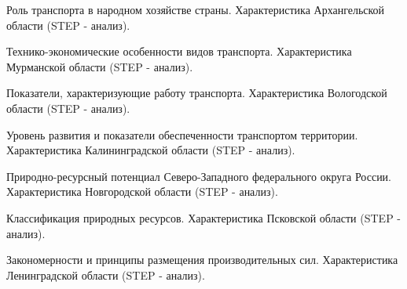 \documentclass[
	14pt,
	a4paper,
	]
	{scrartcl}
\begin{document}
\vfill

\newpage


\shapk
{}
\setcounter{zad}{0}

\vfill
\z Роль транспорта в народном хозяйстве страны.
 \vfill
\z Характеристика Архангельской области (STEP - анализ).
 \vfill

\vfill

\newpage


\shapk
{}
\setcounter{zad}{0}

\vfill
\z Технико-экономические особенности видов транспорта.
 \vfill
\z Характеристика Мурманской области (STEP - анализ).
 \vfill

\vfill

\newpage


\shapk
{}
\setcounter{zad}{0}

\vfill
\z Показатели, характеризующие работу транспорта.
 \vfill
\z Характеристика Вологодской области (STEP - анализ).
 \vfill

\vfill

\newpage


\shapk
{}
\setcounter{zad}{0}

\vfill
\z Уровень развития и показатели обеспеченности транспортом территории.
 \vfill
\z Характеристика Калининградской области (STEP - анализ).
 \vfill

\vfill

\newpage


\shapk
{}
\setcounter{zad}{0}

\vfill
\z Природно-ресурсный потенциал Северо-Западного федерального округа России.
 \vfill
\z Характеристика Новгородской области (STEP - анализ).
 \vfill

\vfill

\newpage


\shapk
{}
\setcounter{zad}{0}

\vfill
\z Классификация природных ресурсов.
 \vfill
\z Характеристика Псковской области (STEP - анализ).
 \vfill

\vfill

\newpage


\shapk
{}
\setcounter{zad}{0}

\vfill
\z Закономерности и принципы размещения производительных сил.
 \vfill
\z Характеристика Ленинградской области (STEP - анализ).
 \vfill
\end{document}
